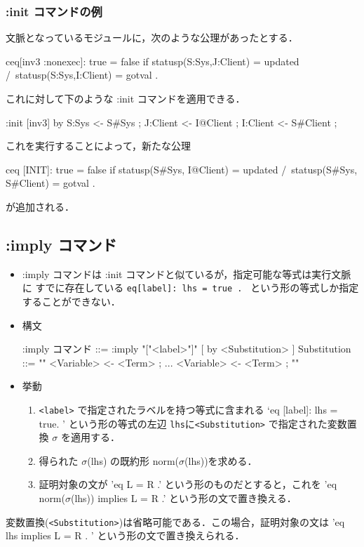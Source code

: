 \documentclass[a4paper,oneside,10pt,here]{memoir}
\newenvironment{vvtm}%
{\parskip=0pt\lineskip=0pt\begin{center}\begin{minipage}{0.8\textwidth}\begin{snugshade}}%
  {\end{snugshade}\end{minipage}\end{center}}
\begin{document}
\subsubsection{:init コマンドの例}

文脈となっているモジュールに，次のような公理があったとする．
\begin{examplev}
ceq[inv3 :nonexec]: true = false if statusp(S:Sys,J:Client) = updated /\ 
                                              statusp(S:Sys,I:Client) = gotval .
\end{examplev}
これに対して下のような :init コマンドを適用できる．
\begin{examplev}
  :init [inv3] by {S:Sys <- S#Sys ; J:Client <- I@Client ; I:Client <- S#Client ;}
\end{examplev}
これを実行することによって，新たな公理
\begin{examplev}
ceq [INIT]: true = false if statusp(S#Sys, I@Client) = updated /\
                                  statusp(S#Sys, S#Client) = gotval .
\end{examplev}
が追加される．

\subsection{:imply コマンド}\label{sec:imply}

\begin{itemize}
\item :imply コマンドは :init コマンドと似ているが，指定可能な等式は実行文脈に
  すでに存在している \verb|eq[label]: lhs = true . | という形の等式しか指定することができない．
\item 構文
  \begin{vvtm}
    \begin{simplev}
 :imply コマンド ::= :imply "["<label>"]" [ by <Substitution> ]
 Substitution   ::= "{" <Variable> <- <Term> ; ... <Variable> <- <Term> ; "}"
    \end{simplev}
  \end{vvtm}
  \item 挙動\\
    \begin{enumerate}
      \item \verb|<label>| で指定されたラベルを持つ等式に含まれる `eq [label]: lhs = true. ' 
        という形の等式の左辺 \verb|lhs|に\verb|<Substitution>| で指定された変数置換 $\sigma$ 
        を適用する．
      \item 得られた $\sigma$(lhs) の既約形 norm($\sigma$(lhs))を求める．
      \item 証明対象の文が 'eq L = R .' という形のものだとすると，これを
        'eq norm($\sigma$(lhs)) implies L = R .' という形の文で置き換える．
      \end{enumerate}
\end{itemize}
変数置換(\verb|<Substitution>|)は省略可能である．この場合，証明対象の文は
'eq lhs implies L = R . ' という形の文で置き換えられる．
\end{document}
